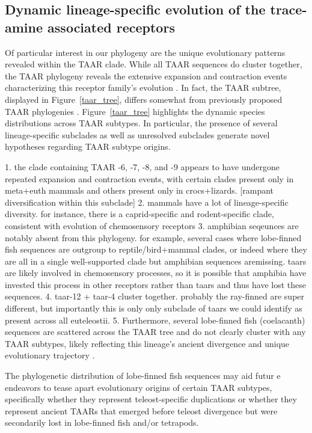 \documentclass[fleqn,10pt]{wlpeerj}
\begin{document}
\subsection*{Dynamic lineage-specific evolution of the trace-amine associated receptors}
Of particular interest in our phylogeny are the unique evolutionary patterns revealed within the TAAR clade. While all TAAR sequences do cluster together, the TAAR phylogeny reveals the extensive expansion and contraction events characterizing this receptor family's evolution \citep{Lindemann2005,Hashiguchi2007,Staubert2010,Staubert2013}. In fact, the TAAR subtree, displayed in Figure~\ref{taar_tree}, differs somewhat from previously proposed TAAR phylogenies \citep{Lindemann2005, Hashiguchi2007}. Figure~\ref{taar_tree} highlights the dynamic species distributions across TAAR subtypes. In particular, the presence of several lineage-specific subclades as well as unresolved subclades generate novel hypotheses regarding TAAR subtype origins. 

1. the clade containing TAAR -6, -7, -8, and -9 appears to have undergone repeated expansion and contraction events, with certain clades present only in meta+euth mammals and others present only in crocs+lizards. [rampant diversification within this subclade]
2. mammals have a lot of lineage-specific diversity. for instance, there is a caprid-specific and rodent-specific clade, consistent with evolution of chemosensory receptors
3. amphibian seqeunces are notably absent from this phylogeny. for example, several cases where lobe-finned fish sequences are outgroup to reptile/bird+mammal clades, or indeed where they are all in a single well-supported clade but amphibian sequences aremissing. taars are likely involved in chemosensory processes, so it is possible that amphibia have invested this process in other receptors rather than taars and thus have lost these sequences.
4. taar-12 + taar-4 cluster together. probably the ray-finned are super different, but importantly this is only only subclade of taars we could identify as present across all euteleostii.
5. Furthermore, several lobe-finned fish (coelacanth) sequences are scattered across the TAAR tree and do not clearly cluster with any TAAR subtypes, likely reflecting this lineage's ancient divergence and unique evolutionary trajectory \citep{coelacanth2013}.



 The phylogenetic distribution of lobe-finned fish sequences may aid futur e endeavors to tease apart evolutionary origins of certain TAAR subtypes, specifically whether they represent teleost-specific duplications \citep{Gloriametal2005} or whether they represent ancient TAARs that emerged before teleost divergence but were secondarily lost in lobe-finned fish and/or tetrapods.
\end{document}
